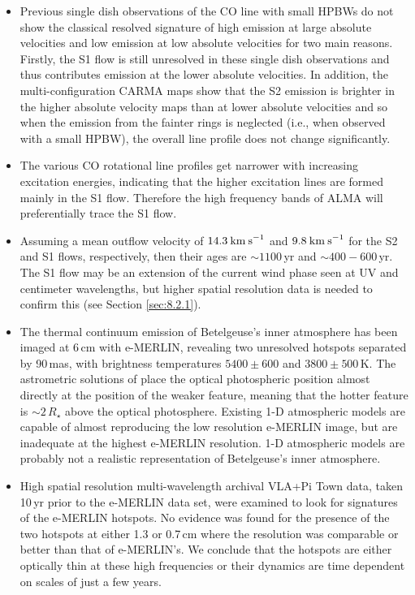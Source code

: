 \begin{itemize}
\item Previous single dish observations of the CO line with small HPBWs do not show the classical resolved signature of high emission at large absolute velocities and low emission at low absolute velocities for two main reasons. Firstly, the S1 flow is still unresolved in these single dish observations and thus contributes emission at the lower absolute velocities. In addition, the multi-configuration CARMA maps show that the S2 emission is brighter in the higher absolute velocity maps than at lower absolute velocities and so when the emission from the fainter rings is neglected (i.e., when observed with a small HPBW), the overall line profile does not change significantly.

\item The various CO rotational line profiles get narrower with increasing excitation energies, indicating that the higher excitation lines are formed mainly in the S1 flow. Therefore the high frequency bands of ALMA will preferentially trace the S1 flow. 

\item Assuming a mean outflow velocity of $14.3\>{\rm km\>s}^{-1}$ and $9.8\>{\rm km\>s}^{-1}$ for the S2 and S1 flows, respectively, then their ages are $\sim 1100$\,yr and $\sim 400 - 600$\,yr. The S1 flow may be an extension of the current wind phase seen at UV and centimeter wavelengths, but higher spatial resolution data is needed to confirm this (see Section \ref{sec:8.2.1}).

\item The thermal continuum emission of Betelgeuse's inner atmosphere has been imaged at 6\,cm with e-MERLIN, revealing two unresolved hotspots separated by 90\,mas, with brightness temperatures $5400\pm 600$ and $3800\pm 500$\,K. The astrometric solutions of \cite{harper_2001} place the optical photospheric position almost directly at the position of the weaker feature, meaning that the hotter feature is $\sim 2\,R_{\star}$ above the optical photosphere. Existing 1-D atmospheric models are capable of almost reproducing the low resolution e-MERLIN image, but are inadequate at the highest e-MERLIN resolution. 1-D atmospheric models are probably not a realistic representation of Betelgeuse's inner atmosphere.

\item High spatial resolution multi-wavelength archival VLA+Pi Town data, taken 10\,yr prior to the e-MERLIN data set, were examined to look for signatures of the e-MERLIN hotspots. No evidence was found for the presence of the two hotspots at either 1.3 or 0.7\,cm where the resolution was comparable or better than that of e-MERLIN's. We conclude that the hotspots are either optically thin at these high frequencies or their dynamics are time dependent on scales of just a few years.


\end{itemize}
